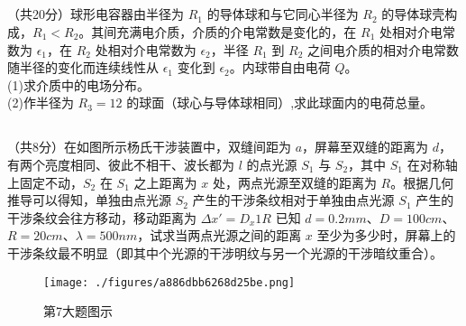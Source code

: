 \subsection{ }
（共20分）球形电容器由半径为 $R_1$ 的导体球和与它同心半径为 $R_2$ 的导体球壳构成，$R_1<R_2$。其间充满电介质，介质的介电常数是变化的，在 $R_1$ 处相对介电常数为 $\epsilon_1$，在 $R_2$ 处相对介电常数为 $\epsilon_2$，半径 $R_1$ 到 $R_2$ 之间电介质的相对介电常数随半径的变化而连续线性从 $\epsilon_1$ 变化到 $\epsilon_2$。内球带自由电荷 $Q$。\\
(1)求介质中的电场分布。\\
(2)作半径为 $R_{3}=12$ 的球面（球心与导体球相同）,求此球面内的电荷总量。\\

\subsection{ }
（共8分）在如图所示杨氏干涉装置中，双缝间距为 $a$，屏幕至双缝的距离为 $d$，有两个亮度相同、彼此不相干、波长都为 $l$ 的点光源 $S_1$ 与 $S_2$，其中 $S_1$ 在对称轴上固定不动，$S_2$ 在 $S_1$ 之上距离为 $x$ 处，两点光源至双缝的距离为 $R$。根据几何推导可以得知，单独由点光源 $S_2$ 产生的干涉条纹相对于单独由点光源 $S_1$ 产生的干涉条纹会往方移动，移动距离为 $\Delta x'=D_{x}1R$ 已知 $d=0.2mm$、$D=100cm$、$R=20cm$、$\lambda =500nm$，试求当两点光源之间的距离 $x$ 至少为多少时，屏幕上的干涉条纹最不明显（即其中个光源的干涉明纹与另一个光源的干涉暗纹重合）。\\
\begin{figure}[ht]
\centering
\texttt{[image: ./figures/a886dbb6268d25be.png]}
\caption{第7大题图示} \label{fig_CAS20_4}
\end{figure}